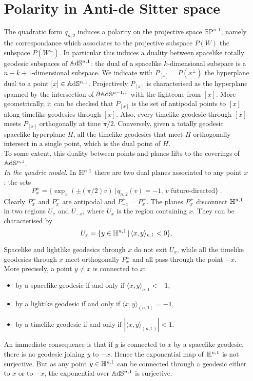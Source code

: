 \section{Polarity in Anti-de Sitter space} \label{sec:reg}
The quadratic form $q_{n,2}$ induces a polarity on the projective space $\mathbb{R} \text{P}^{n,1}$, namely the correspondance which associates to the projective subspace $P(W)$ the subspace $P(W^ \perp)$. In particular this induces a duality between spacelike totally geodesic subspaces of $\mathbb{A}\mathrm{d}\mathbb{S}^{n,1}$: the dual of a spacelike $k$-dimensional subspace is a $n-k+1$-dimensional subspace.
We indicate with $P_{[x]}=P(x^\perp)$ the hyperplane dual to a point $[x]\in \mathbb{A}\mathrm{d}\mathbb{S}^{n,1}$.
Projectively $P_{[x]}$ is characterised as the hyperplane spanned by the intersection of $\partial\mathbb{A}\mathrm{d}\mathbb{S}^{n-1,1}$ with the lightcone from $[x]$.
More geometrically, it can be checked that $P_{[x]}$ is the set of antipodal points to $[x]$ along timelike geodesics through $[x]$. Also, every timelike geodesic
through $[x]$ meets $P_{[x]}$ orthogonally at time $\pi/2$. Conversely, given a totally geodesic spacelike hyperplane $H$, all the timelike geodesics that meet $H$ orthogonally  intersect in a single point, which is the dual point of $H$.\\
To some extent, this duality between points and planes lifts to the coverings of $\mathbb{A}\mathrm{d}\mathbb{S}^{n,1}$.\\

\noindent\textit{In the quadric model}. In $\mathbb{H}^{n,1}$ there are two dual planes associated to any point $x$: the sets 
\[
P_{x}^\pm=\{\exp_{x}(\pm(\pi/2)v)\,|\,q_{n,2}(v)=-1,\,v\text{ future-directed}\}~.
\]
Clearly $P_{x}^+$ and $P_{x}^{-} $ are antipodal and  $P_{-x}^\pm=P_{x}^\mp$. The planes $P_x^{\pm}$ disconnect $\mathbb{H}^{n,1}$ in two regions $U_x$ and
$U_{-x}$, where $U_{x}$ is the region containing $x$. They can be characterised by 
\[
U_{x}=\{y\in\mathbb{H}^{n,1}\,|\,\langle x, y\rangle_{n,1}<0\}.
\]

Spacelike and lightlike geodesics through $x$ do not exit $U_{x}$, 
while all the timelike geodesics through $x$ meet orthogonally $P^{\pm}_x$ and all pass through the point $-x$.
More precisely, a point $y\neq x$ is connected to $x$:
\begin{itemize}
\item by a spacelike geodesic if and only if $\langle x,y\rangle_{n,1}<-1$,
\item by a lightike geodesic if and only if $\langle x,y\rangle_{(n,1)}=-1$,
\item by a timelike geodesic if and only if 
$|\langle x,y\rangle_{(n,1)}|<1$.
\end{itemize}
An immediate consequence is that if $y$ is connected to $x$ by a spacelike geodesic, there is no geodesic joining $y$ to $-x$.
Hence the exponential map of $\mathbb{H}^{n,1}$ is not surjective. But as any point $y\in\mathbb{H}^{n,1}$ can be connected through a geodesic either to $x$ or to $-x$,
the exponential over $\mathbb{A}\mathrm{d}\mathbb{S}^{n,1}$ is surjective.\\

